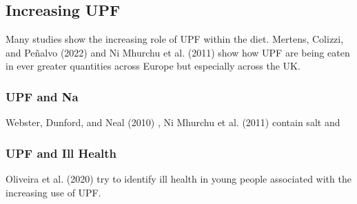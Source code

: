 \documentclass[
]{article}
\begin{document}
\hypertarget{increasing-upf}{%
\subsection{Increasing UPF}\label{increasing-upf}}

Many studies show the increasing role of UPF within the diet. Mertens,
Colizzi, and Peñalvo (2022) and Ni Mhurchu et al. (2011) show how UPF
are being eaten in ever greater quantities across Europe but especially
across the UK.

\hypertarget{upf-and-na}{%
\subsubsection{UPF and Na}\label{upf-and-na}}

Webster, Dunford, and Neal (2010) , Ni Mhurchu et al. (2011) contain
salt and

\hypertarget{upf-and-ill-health}{%
\subsubsection{UPF and Ill Health}\label{upf-and-ill-health}}

Oliveira et al. (2020) try to identify ill health in young people
associated with the increasing use of UPF.
\end{document}
